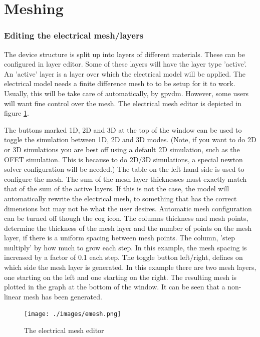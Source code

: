 
\section{Meshing}
\subsubsection{Editing the electrical mesh/layers}
The device structure is split up into layers of different materials.  These can be configured in layer editor.  Some of these layers will have the layer type 'active'.  An 'active' layer is a layer over which the electrical model will be applied.  The electrical model needs a finite difference mesh to to be setup for it to work.  Usually, this will be take care of automatically, by gpvdm.  However, some users will want fine control over the mesh.  The electrical mesh editor is depicted in figure \ref{fig:emesh}.


The buttons marked 1D, 2D and 3D at the top of the window can be used to toggle the simulation between 1D, 2D and 3D modes.  (Note, if you want to do 2D or 3D simulations you are best off using a default 2D simulation, such as the OFET simulation.  This is because to do 2D/3D simulations, a special newton solver configuration will be needed.) The table on the left hand side is used to configure the mesh.  The sum of the mesh layer thicknesses must exactly match that of the sum of the active layers.  If this is not the case, the model will automatically rewrite the electrical mesh, to something that has the correct dimensions but may not be what the user desires.  Automatic mesh configuration can be turned off though the cog icon.  The columns thickness and mesh points, determine the thickness of the mesh layer and the number of points on the mesh layer, if there is a uniform spacing between mesh points.  The column, 'step multiply' by how much to grow each step.  In this example, the mesh spacing is increased by a factor of 0.1 each step.  The toggle button left/right, defines on which side the mesh layer is generated.  In this example there are two mesh layers, one starting on the left and one starting on the right.  The resulting mesh is plotted in the graph at the bottom of the window.  It can be seen that a non-linear mesh has been generated.

\begin{figure}[ht!]
\centering
\texttt{[image: ./images/emesh.png]}
\caption{The electrical mesh editor}
\label{fig:emesh}
\end{figure}

